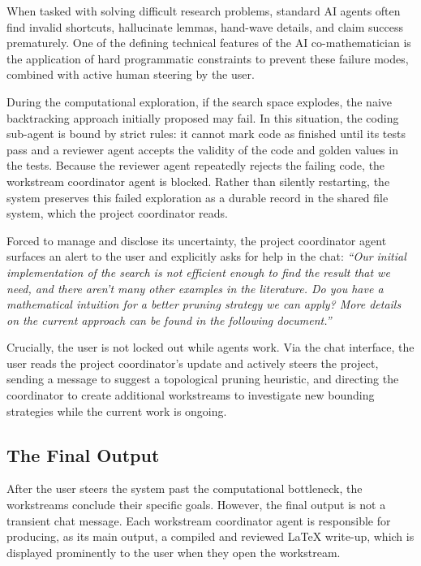 \documentclass[11pt, a4paper, copyright, gdm]{google}
\newcommand{\user}[1]{\emph{#1}}
\begin{document}
When tasked with solving difficult research problems, standard AI agents often find invalid shortcuts, hallucinate lemmas, hand-wave details, and claim success prematurely.
One of the defining technical features of the AI co-mathematician is the application of hard programmatic constraints to prevent these failure modes, combined with active human steering by the user.

During the computational exploration, if the search space explodes, the naive backtracking approach initially proposed may fail.
In this situation, the coding sub-agent is bound by strict rules: it cannot mark code as finished until its tests pass and a reviewer agent accepts the validity of the code and golden values in the tests.
Because the reviewer agent repeatedly rejects the failing code, the workstream coordinator agent is blocked.
Rather than silently restarting, the system preserves this failed exploration as a durable record in the shared file system, which the project coordinator reads.

Forced to manage and disclose its uncertainty, the project coordinator agent surfaces an alert to the user and explicitly asks for help in the chat: \user{``Our initial implementation of the search is not efficient enough to find the result that we need, and there aren't many other examples in the literature. Do you have a mathematical intuition for a better pruning strategy we can apply? More details on the current approach can be found in the following document.''}

Crucially, the user is not locked out while agents work.
Via the chat interface, the user reads the project coordinator's update and actively steers the project, sending a message to suggest a topological pruning heuristic, and directing the coordinator to create additional workstreams to investigate new bounding strategies while the current work is ongoing.

\subsection{The Final Output}

After the user steers the system past the computational bottleneck, the workstreams conclude their specific goals.
However, the final output is not a transient chat message.
%
Each workstream coordinator agent is responsible for producing, as its main output, a compiled and reviewed LaTeX write-up, which is displayed prominently to the user when they open the workstream.
\end{document}
